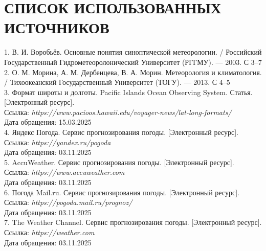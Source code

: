 \chapter*{СПИСОК ИСПОЛЬЗОВАННЫХ ИСТОЧНИКОВ}

\hspace{-1.25cm}
1. В. И. Воробьёв. Основные понятия синоптической метеорологии. / Российский Государственный Гидрометеоролонический Университет  (РГГМУ). --- 2003. С 3--7 \\

\hspace{-1.25cm}
2. О. М. Морина, А. М. Дербенцева, В. А. Морин. Метеорология и климатология. / Тихоокеанский Государственный Университет (ТОГУ). --- 2013. С 4--5 \\

\hspace{-1.25cm}
3. Формат широты и долготы. Pacific Islands Ocean Observing System. Статья. [Электронный ресурс]. \\
Ссылка: \textit { https://www.pacioos.hawaii.edu/voyager-news/lat-long-formats/ } \\
Дата обращения: 15.03.2025 \\

\hspace{-1.25cm}
4. Яндекс Погода. Сервис прогнозирования погоды. [Электронный ресурс]. \\
Ссылка: \textit { https://yandex.ru/pogoda } \\
Дата обращения: 03.11.2025 \\

\hspace{-1.25cm}
5. AccuWeather. Сервис прогнозирования погоды. [Электронный ресурс]. \\
Ссылка: \textit { https://www.accuweather.com } \\
Дата обращения: 03.11.2025 \\

\hspace{-1.25cm}
6. Погода Mail.ru. Сервис прогнозирования погоды. [Электронный ресурс]. \\
Ссылка: \textit { https://pogoda.mail.ru/prognoz/ } \\
Дата обращения: 03.11.2025 \\

\hspace{-1.25cm}
7. The Weather Channel. Сервис прогнозирования погоды. [Электронный ресурс]. \\
Ссылка: \textit { https://weather.com } \\
Дата обращения: 03.11.2025 \\

